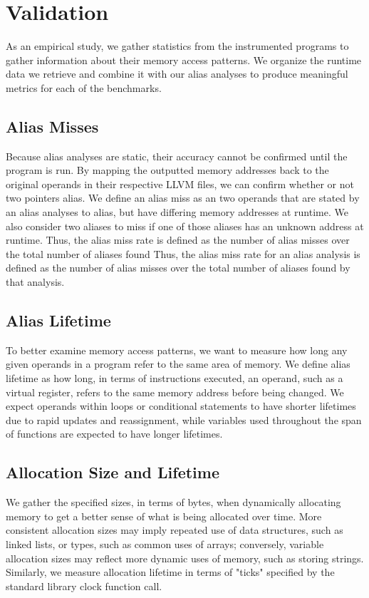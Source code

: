 \chapter{Validation}

As an empirical study, we gather statistics from the instrumented programs to gather information about their memory access patterns. We organize the runtime data we retrieve and combine it with our alias analyses to produce meaningful metrics for each of the benchmarks.

\section{Alias Misses}
Because alias analyses are static, their accuracy cannot be confirmed until the program is run. By mapping the outputted memory addresses back to the original operands in their respective LLVM files, we can confirm whether or not two pointers alias. We define an alias miss as an two operands that are stated by an alias analyses to alias, but have differing memory addresses at runtime. We also consider two aliases to miss if one of those aliases has an unknown address at runtime. Thus, the alias miss rate is defined as the number of alias misses over the total number of aliases found Thus, the alias miss rate for an alias analysis is defined as the number of alias misses over the total number of aliases found by that analysis.

\section{Alias Lifetime}
To better examine memory access patterns, we want to measure how long any given operands in a program refer to the same area of memory. We define alias lifetime as how long, in terms of instructions executed, an operand, such as a virtual register, refers to the same memory address before being changed. We expect operands within loops or conditional statements to have shorter lifetimes due to rapid updates and reassignment, while variables used throughout the span of functions are expected to have longer lifetimes.

\section{Allocation Size and Lifetime}
We gather the specified sizes, in terms of bytes, when dynamically allocating memory to get a better sense of what is being allocated over time. More consistent allocation sizes may imply repeated use of data structures, such as linked lists, or types, such as common uses of arrays; conversely, variable allocation sizes may reflect more dynamic uses of memory, such as storing strings. Similarly, we measure allocation lifetime in terms of "ticks" specified by the standard library clock function call.
